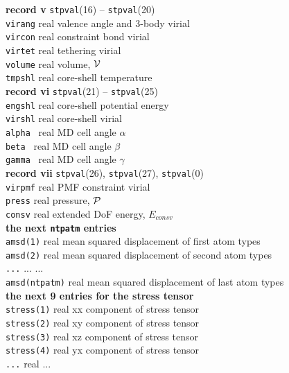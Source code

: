 \begin{tabbing}
{\bf record v} {\tt stpval}(16) -- {\tt stpval}(20) \\
\> {\tt virang} \> real    \> valence angle and 3-body virial \\
\> {\tt vircon} \> real    \> constraint bond virial \\
\> {\tt virtet} \> real    \> tethering virial \\
\> {\tt volume} \> real    \> volume, ${\cal V}$ \\
\> {\tt tmpshl} \> real    \> core-shell temperature \\
{\bf record vi} {\tt stpval}(21) -- {\tt stpval}(25) \\
\> {\tt engshl} \> real    \> core-shell potential energy \\
\> {\tt virshl} \> real    \> core-shell virial \\
\> {\tt alpha } \> real    \> MD cell angle $\alpha$ \\
\> {\tt beta }  \> real    \> MD cell angle $\beta$ \\
\> {\tt gamma } \> real    \> MD cell angle $\gamma$ \\
{\bf record vii} {\tt stpval}(26), {\tt stpval}(27), {\tt stpval}(0) \\
\> {\tt virpmf} \> real    \> PMF constraint virial \\
\> {\tt press}  \> real    \> pressure, ${\cal P}$ \\
\> {\tt consv}  \> real    \> extended DoF energy, $E_{consv}$ \\
{\bf the next {\tt ntpatm} entries} \\
\> {\tt amsd(1)} \> real   \> mean squared displacement of first atom types \\
\> {\tt amsd(2)} \> real   \> mean squared displacement of second atom types \\
\> {\tt ...} \> ... \> ... \\
\> {\tt amsd(ntpatm)} \> real \> mean squared displacement of last atom types \\
{\bf the next 9 entries for the stress tensor} \\
\> {\tt stress(1)} \> real \> xx component of stress tensor \\
\> {\tt stress(2)} \> real \> xy component of stress tensor \\
\> {\tt stress(3)} \> real \> xz component of stress tensor \\
\> {\tt stress(4)} \> real \> yx component of stress tensor \\
\> {\tt ...} \> real \> ... \\

\end{tabbing}
